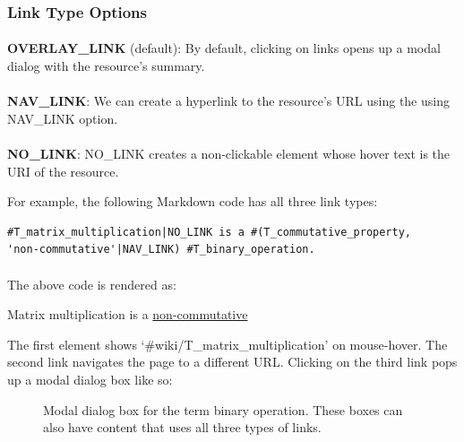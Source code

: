 \documentclass[]{ceurart}
\begin{document}
\subsubsection{Link Type Options}

\paragraph{}\textbf{OVERLAY\_LINK} (default): By default, clicking on links opens up a modal dialog with the resource's summary.

\paragraph{}\textbf{NAV\_LINK}: We can create a hyperlink to the resource's URL using the using NAV\_LINK option.

\paragraph{}\textbf{NO\_LINK}: NO\_LINK creates a non-clickable element whose hover text is the URI of the resource.


For example, the following Markdown code has all three link types:
\begin{verbatim}
#T_matrix_multiplication|NO_LINK is a #(T_commutative_property, 
'non-commutative'|NAV_LINK) #T_binary_operation.
\end{verbatim}

\paragraph{}The above code is rendered as:
\begin{mdframed}
Matrix multiplication is a \underline{non-commutative} 
\end{mdframed}
The first element shows `\#wiki/T\_matrix\_multiplication' on mouse-hover. The second link navigates the page to a different URL. Clicking on the third link pops up a modal dialog box like so:

\begin{figure}[ht]
\begin{center}
\caption{Modal dialog box for the term binary operation. These boxes can also have content that uses all three types of links. }
\label{modal}
\end{center}
\end{figure}
\end{document}
